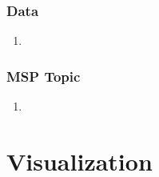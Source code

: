 \subsubsection*{Data}
\begin{enumerate}
\item {}
\end{enumerate}
\subsubsection*{MSP Topic}
\begin{enumerate}
\item {}
\end{enumerate}


\section{Visualization}

